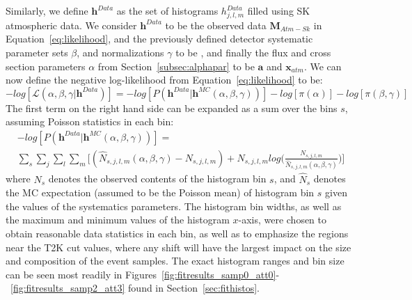 Similarly, we define $\mathbf{h}^{Data}$ as the set of histograms
$h^{Data}_{j,l,m}$ filled using SK atmospheric data. We consider $
\mathbf{h}^{Data}$ to be the observed data $\mathbf{M}_{Atm-Sk}$ in
Equation~\ref{eq:likelihood}, and the previously defined detector systematic
parameter sets $\beta$, and normalizations $\gamma$ to be \ldsk, and finally
the flux and cross section parameters $\alpha$ from
Section~\ref{subsec:alphapar} to be $\mathbf{a}$ and $\mathbf{x}_{atm}$.  We can now define the
negative log-likelihood from Equation~\ref{eq:likelihood} to be:
%
\begin{equation}
  \label{eq:loglikelihood}
  -log[\mathcal{L}(\alpha,\beta,\gamma | \mathbf{h}^{Data} )] =
  -log[P( \mathbf{h}^{Data} | \mathbf{h}^{MC}(\alpha,\beta,\gamma))] - log[\pi(\alpha)]
  - log[\pi(\beta,\gamma)]
\end{equation}
%
The first term on the right hand side can be expanded as a sum over the bins
$s$, assuming Poisson statistics in each bin:
%
\begin{gather*}
  \label{eq:logpoisson}
  -log[P( \mathbf{h}^{Data} | \mathbf{h}^{MC}(\alpha,\beta,\gamma))] = \\
    \sum\limits_{s}^{} \sum\limits_{j}^{} \sum\limits_{l}^{} \sum\limits_{m}^{} 
   \bigg[ (\hat{N}_{s,j,l,m}(\alpha,\beta,\gamma) - N_{s,j,l,m}) +
  N_{s,j,l,m}log\bigg(\frac{N_{s,j,l,m}}{\hat{N}_{s,j,l,m}(\alpha,\beta,\gamma)}\bigg)\bigg]
\end{gather*}
%
where $N_{s}$ denotes the observed contents of the histogram bin $s$, and
$\hat{N}_{s}$ denotes the MC expectation (assumed to be the Poisson mean) of
histogram bin $s$ given the values of the systematics parameters.  The
histogram bin widths, as well as the maximum and minimum values of the
histogram $x$-axis, were chosen to obtain reasonable data statistics in each
bin, as well as to emphasize the regions near the T2K cut values, where any
shift will have the largest impact on the size and composition of the event
samples.  The exact histogram ranges and bin size can be seen most readily in 
Figures~\ref{fig:fitresults_samp0_att0}-~\ref{fig:fitresults_samp2_att3} found in 
Section~\ref{sec:fithistos}.

